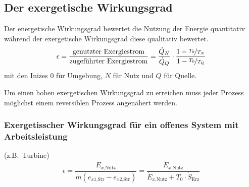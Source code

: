 	\subsection{Der exergetische Wirkungsgrad} %
		Der energetische Wirkungsgrad bewertet die Nutzung der Energie quantitativ während der exergetische Wirkungsgrad diese qualitativ bewertet.
		\[
			\epsilon = \frac{\text{genutzter Exergiestrom}}{\text{zugeführter Exergiestrom}} = \frac{\dot Q_N}{\dot Q_Q} \cdot \frac{1-\nicefrac{T_0}{T_N}}{1-\nicefrac{T_0}{T_Q}}
		\]
		mit den Inizes $0$ für Umgebung, $N$ für Nutz und $Q$ für Quelle.
		
		Um einen hohen exergetischen Wirkungsgrad zu erreichen muss jeder Prozess möglichst einem reversiblen Prozess angenähert werden.
		
		\subsubsection{Exergetisscher Wirkungsgrad für ein offenes System mit Arbeitsleistung} %
			(z.B.~Turbine)
			\[
				\epsilon = \frac{\dot E_{x\text{,Nutz}}}{\dot m (e_{x1\text{,Str}} - e_{x2\text{,Str}})} = \frac{\dot E_{x\text{,Nutz}}}{\dot E_{x\text{,Nutz}} + T_0 \cdot \dot S_\text{Erz}}
			\]
